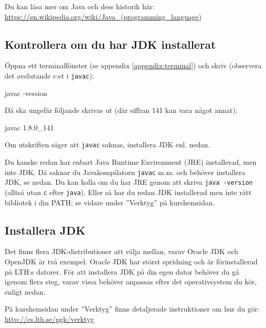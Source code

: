 \noindent Du kan läsa mer om Java och dess historik här: \\
\href{https://en.wikipedia.org/wiki/Java_(programming_language)}{https://en.wikipedia.org/wiki/Java\_(programming\_language)}

\subsection{Kontrollera om du har JDK installerat}\label{appendix:compile:check-jdk}

Öppna ett terminalfönster (se appendix \ref{appendix:terminal}) och skriv (observera det avslutande c:et i \texttt{javac}):
\begin{REPLnonum}
javac -version
\end{REPLnonum}
Då ska ungefär följande skrivas ut (där siffran 141 kan vara något annat):
\begin{REPLnonum}
javac 1.8.0_141
\end{REPLnonum}
Om utskriften säger att \texttt{javac} saknas, installera JDK enl. nedan.

Du kanske redan har enbart Java Runtime Environment (JRE) installerad, men inte JDK. Då saknar du Javakompilatorn \texttt{javac} m.m. och behöver installera JDK, se nedan. Du kan kolla om du har JRE genom att skriva \texttt{java -version} (alltså utan \texttt{c} efter \texttt{java}). Eller så har du redan JDK installerad men inte rätt bibliotek i din PATH; se vidare under ''Verktyg'' på kurshemsidan.



\subsection{Installera JDK}\label{appendix:compile:install-jdk}

Det finns flera JDK-distributioner att välja mellan, varav Oracle JDK och OpenJDK är två exempel. Oracle JDK har störst spridning och är förinstallerad på LTH:s datorer. För att installera JDK på din egen dator behöver du gå igenom flera steg, varav vissa behöver anpassas efter det operativsystem du kör, enligt nedan.

På kurshemsidan under ''Verktyg'' finns detaljerade instruktioner om hur du gör:  \url{http://cs.lth.se/pgk/verktyg}

